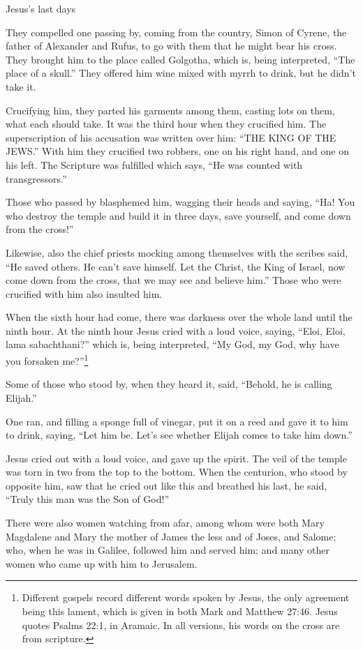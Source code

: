 \documentclass[10pt,twoside]{book}
\begin{document}
\begin{section}{Jesus's last days}
{  They compelled one passing by, coming from the country, Simon of Cyrene, the father of Alexander and Rufus, to go with them that he might bear his cross.   They brought him to the place called Golgotha, which is, being interpreted, ``The place of a skull.''   They offered him wine mixed with myrrh to drink, but he didn't take it.

  Crucifying him, they parted his garments among them, casting lots on them, what each should take.   It was the third hour when they crucified him.   The superscription of his accusation was written over him: ``THE KING OF THE JEWS.''   With him they crucified two robbers, one on his right hand, and one on his left.   The Scripture was fulfilled which says, ``He was counted with transgressors.''

  Those who passed by blasphemed him, wagging their heads and saying, ``Ha! You who destroy the temple and build it in three days,   save yourself, and come down from the cross!''

  Likewise, also the chief priests mocking among themselves with the scribes said, ``He saved others. He can't save himself.   Let the Christ, the King of Israel, now come down from the cross, that we may see and believe him.'' Those who were crucified with him also insulted him.

  When the sixth hour had come, there was darkness over the whole land until the ninth hour.   At the ninth hour Jesus cried with a loud voice, saying, ``Eloi, Eloi, lama sabachthani?'' which is, being interpreted, ``My God, my God, why have
you forsaken me?''\footnote{Different gospels record different words spoken by Jesus, the only agreement being this lament, which is
given in both Mark and Matthew 27:46. Jesus quotes Psalms 22:1, in Aramaic. In all versions, his words on the cross are from scripture.}

  Some of those who stood by, when they heard it, said, ``Behold, he is calling Elijah.''

  One ran, and filling a sponge full of vinegar, put it on a reed and gave it to him to drink, saying, ``Let him be. Let's see whether Elijah comes to take him down.''

  Jesus cried out with a loud voice, and gave up the spirit.   The veil of the temple was torn in two from the top to the bottom.   When the centurion, who stood by opposite him, saw that he cried out like this and breathed his last, he said, ``Truly this man was the Son of God!''

  There were also women watching from afar, among whom were both Mary Magdalene and Mary the mother of James the less and of Joses, and Salome;   who, when he was in Galilee, followed him and served him; and many other women who came up with him to Jerusalem.
}


\end{section}
\end{document}
